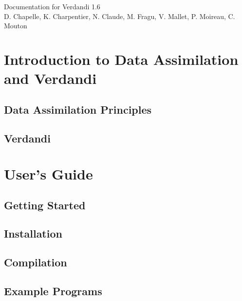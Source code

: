 \documentclass{book}
\begin{document}
\hypersetup{pageanchor=false,citecolor=blue}
\begin{titlepage}
\vspace*{7cm}
\begin{center}
{\Large Documentation for Verdandi 1.6}\\
\vspace*{1cm}
{\large D. Chapelle, K. Charpentier, N. Claude, M. Fragu, V. Mallet, P. Moireau, C. Mouton}\\
\end{center}
\end{titlepage}
\clearemptydoublepage
{}
\tableofcontents
\clearemptydoublepage
{}
\hypersetup{pageanchor=true,citecolor=blue}
\part{Introduction to Data Assimilation and Verdandi}
\chapter{Data Assimilation Principles}

\chapter{Verdandi}
\label{index}\hypertarget{index}{}
\part{User's Guide}
\chapter{Getting Started}
\label{getting_started}
\hypertarget{getting_started}{}

\chapter{Installation}
\label{installation}
\hypertarget{installation}{}

\chapter{Compilation}
\label{compilation}
\hypertarget{compilation}{}

\chapter{Example Programs}
\label{example_programs}
\hypertarget{example_programs}{}

\end{document}
